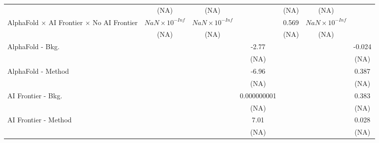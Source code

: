 \begin{tabular}{lcccccc}
                                                                              & (NA)                   & (NA)                   &                        & (NA)  & (NA)                   &   \\   
   AlphaFold $\times$ AI Frontier $\times$ No AI Frontier                     & $NaN\times 10^{-Inf}$  & $NaN\times 10^{-Inf}$  &                        & 0.569 & $NaN\times 10^{-Inf}$  &   \\   
                                                                              & (NA)                   & (NA)                   &                        & (NA)  & (NA)                   &   \\   
   AlphaFold - Bkg.                                                           &                        &                        & -2.77                  &       &                        & -0.024\\   
                                                                              &                        &                        & (NA)                   &       &                        & (NA)\\   
   AlphaFold - Method                                                         &                        &                        & -6.96                  &       &                        & 0.387\\   
                                                                              &                        &                        & (NA)                   &       &                        & (NA)\\   
   AI Frontier - Bkg.                                                         &                        &                        & 0.000000001            &       &                        & 0.383\\   
                                                                              &                        &                        & (NA)                   &       &                        & (NA)\\   
   AI Frontier - Method                                                       &                        &                        & 7.01                   &       &                        & 0.028\\   
                                                                              &                        &                        & (NA)                   &       &                        & (NA)\\   

\end{tabular}
